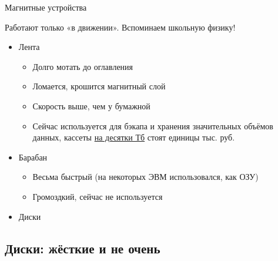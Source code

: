 \documentclass[xetex,aspectratio=43]{beamer}
\begin{document}
\begin{frame}{Магнитные устройства}

Работают только «в движении». Вспоминаем школьную физику!

\begin{itemize}
\tightlist
\item
  Лента

  \begin{itemize}
  \tightlist
  \item
    Долго мотать до оглавления
  \item
    Ломается, крошится магнитный слой
  \item
    Скорость выше, чем у бумажной
  \item
    Сейчас используется для бэкапа и хранения значительных объёмов данных,
    кассеты \href{https://en.wikipedia.org/wiki/Linear\_Tape-Open\#Key\_specifications}{на десятки Тб}
    стоят единицы тыс. руб.
  \end{itemize}
\item
  Барабан

  \begin{itemize}
  \tightlist
  \item
    Весьма быстрый (на некоторых ЭВМ использовался, как ОЗУ)
  \item
    Громоздкий, сейчас не используется
  \end{itemize}
\item
  Диски
\end{itemize}
\end{frame}

\subsection{Диски: жёсткие и не очень}
\end{document}
